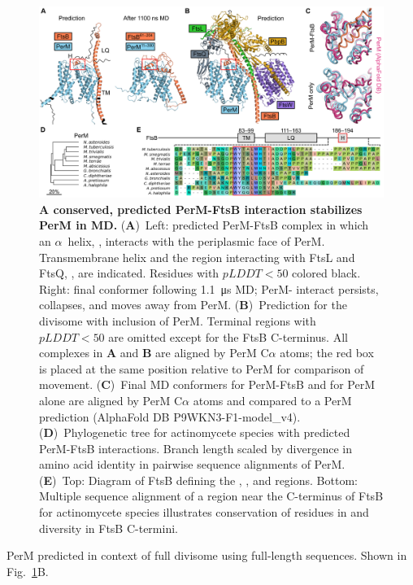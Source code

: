 \documentclass[pdflatex,sn-basic]{sn-jnl}%
\begin{document}
\begin{figure}[h]
\centering
\includegraphics[width=1.0\textwidth]{../figures/fig1_1.png}
\caption{\textbf{A conserved, predicted \mtb{} PerM-FtsB interaction stabilizes PerM in MD.} (\textbf{A})~Left: predicted PerM-FtsB complex in which an $\alpha$~helix, \ftsbH{}, interacts with the periplasmic face of PerM. Transmembrane helix \ftsbTM{} and the region interacting with FtsL and FtsQ, \ftsbLQ{}, are indicated. Residues with $pLDDT < 50$ colored black. Right: final conformer following \qty{1.1}{\us} MD; PerM-\ftsbH{} interact persists, \ftsbLQ{} collapses, and \ftsbTM{} moves away from PerM. (\textbf{B})~Prediction for the \mtb{} divisome with inclusion of PerM. Terminal regions with $pLDDT < 50$ are omitted except for the FtsB C-terminus. All complexes in \textbf{A} and \textbf{B} are aligned by PerM C$\alpha$ atoms; the red box is placed at the same position relative to PerM for comparison of \ftsbH{} movement. (\textbf{C})~Final MD conformers for PerM-FtsB and for PerM alone are aligned by PerM C$\alpha$ atoms and compared to a PerM prediction  (AlphaFold DB P9WKN3-F1-model{\_}v4). (\textbf{D})~Phylogenetic tree for actinomycete species with predicted PerM-FtsB interactions. Branch length scaled by divergence in amino acid identity in pairwise sequence alignments of PerM. (\textbf{E})~Top: Diagram of \mtb{} FtsB defining the \ftsbTM{}, \ftsbLQ{}, and \ftsbH{} regions. Bottom: Multiple sequence alignment of a region near the C-terminus of FtsB for actinomycete species illustrates conservation of residues in \ftsbH{} and diversity in FtsB C-termini.}\label{fig1_1}
\end{figure}

\loremipsum{}

PerM predicted in context of full divisome using full-length sequences.
Shown in Fig.~\ref{fig1_1}B.
\end{document}
